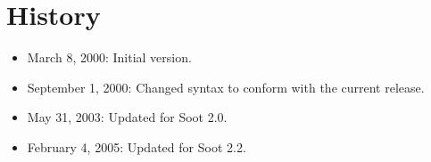\documentclass{article}
\begin{document}
\section{History}
\begin{itemize}
\item March 8, 2000: Initial version.
\item September 1, 2000: Changed syntax to conform with the current release.
\item May 31, 2003: Updated for Soot 2.0.
\item February 4, 2005: Updated for Soot 2.2.
\end{itemize}
\end{document}
